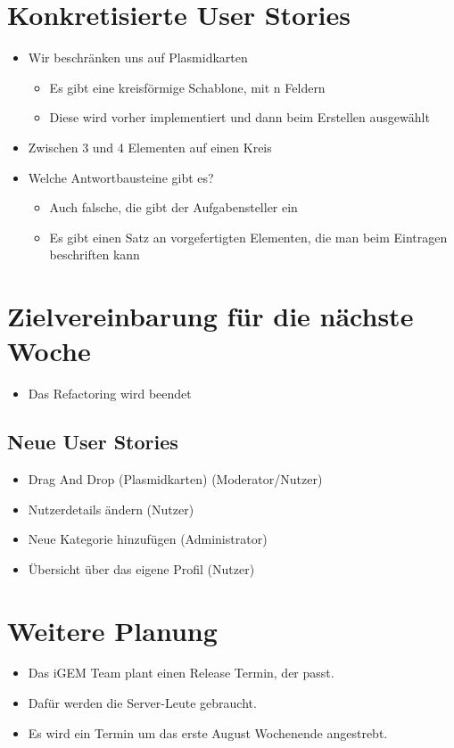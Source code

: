 \documentclass[colorback, accentcolor=tud1c, paper=a4]{tudexercise}
\begin{document}
\begin{multicols}{2}
\section{Konkretisierte User Stories}
\begin{itemize}
	\item Wir beschränken uns auf Plasmidkarten
	\begin{itemize}
		\item Es gibt eine kreisförmige Schablone, mit n Feldern
		\item Diese wird vorher implementiert und dann beim Erstellen ausgewählt
	\end{itemize}
	\item Zwischen 3 und 4 Elementen auf einen Kreis
	\item Welche Antwortbausteine gibt es?
	\begin{itemize}
		\item Auch falsche, die gibt der Aufgabensteller ein
		\item Es gibt einen Satz an vorgefertigten Elementen, die man beim Eintragen beschriften kann
	\end{itemize}
\end{itemize}

\section{Zielvereinbarung für die nächste Woche}
\begin{itemize}
	\item Das Refactoring wird beendet
\end{itemize}
\subsection{Neue User Stories}
\begin{itemize}
	\item Drag And Drop (Plasmidkarten) (Moderator/Nutzer)
	\item Nutzerdetails ändern (Nutzer)
	\item Neue Kategorie hinzufügen (Administrator)
	\item Übersicht über das eigene Profil (Nutzer)
\end{itemize}

\section{Weitere Planung}
\begin{itemize}
	\item Das iGEM Team plant einen Release Termin, der passt. 
	\item Dafür werden die Server-Leute gebraucht.
	\item Es wird ein Termin um das erste August Wochenende angestrebt.
\end{itemize}


\end{multicols}
\end{document}
